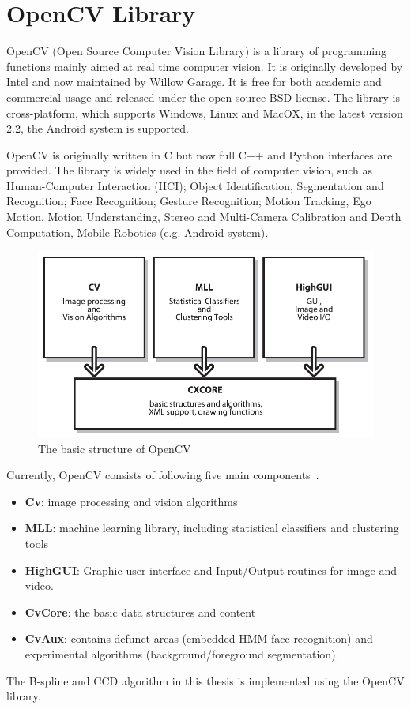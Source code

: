\section{OpenCV Library}
\label{sec:opencv}

OpenCV (Open Source Computer Vision Library) is a library of
programming functions mainly aimed at real time computer vision. It is
originally developed by Intel and now maintained by Willow Garage. It
is free for both academic and commercial usage and released  under the
open source BSD license. The library is cross-platform, which supports
Windows, Linux and MacOX,  in the latest version 2.2, the Android
system is supported.

OpenCV is originally written in C but now full C++ and Python
interfaces are provided. The library is widely used in the field of
computer vision, such as Human-Computer Interaction (HCI); Object
Identification, Segmentation and Recognition; Face Recognition;
Gesture Recognition; Motion Tracking, Ego Motion, Motion
Understanding, Stereo and Multi-Camera
Calibration and Depth Computation, Mobile Robotics (e.g. Android
system).

\begin{figure}[htbp]
  \centering
\includegraphics[width=\linewidth]{images/bsopencv.png}
  \caption{The basic structure of OpenCV~\cite{bradski2008learning}}
  \label{fig:bsopencv}
\end{figure}

Currently, OpenCV consists of following five main components~\cite{bradski2008learning}.
\begin{itemize}
\item \textbf{Cv}: image processing and vision algorithms
\item \textbf{MLL}: machine learning library, including statistical classifiers and clustering tools
\item \textbf{HighGUI}: Graphic user interface and Input/Output
  routines for image and video.
\item \textbf{CvCore}: the basic data structures and content
\item \textbf{CvAux}: contains defunct areas (embedded HMM face
  recognition) and experimental algorithms (background/foreground
  segmentation).
\end{itemize}

The B-spline and CCD algorithm in this thesis is implemented using the
OpenCV library.


